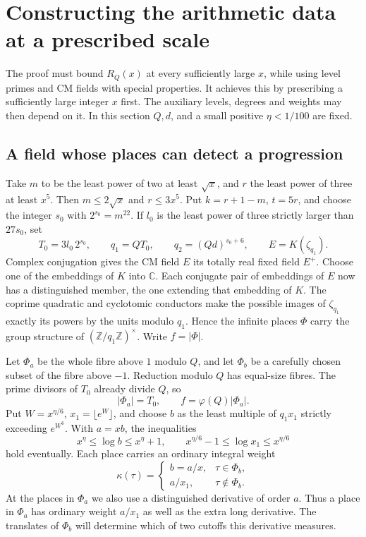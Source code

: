 \section{Constructing the arithmetic data at a prescribed scale}\label{sec:setup}
The proof must bound \(R_Q(x)\) at every sufficiently large \(x\), while using level primes and CM fields with special properties. It achieves this by prescribing a sufficiently large integer \(x\) first. The auxiliary levels, degrees and weights may then depend on it. In this section \(Q,d\), and a small positive \(\eta<1/100\) are fixed.

\subsection{A field whose places can detect a progression}
Take \(m\) to be the least power of two at least \(\sqrt{x}\), and \(r\) the least power of three at least \(x^5\). Then \(m\le2\sqrt{x}\) and \(r\le3x^5\). Put \(k=r+1-m\), \(t=5r\), and choose the integer \(s_0\) with \(2^{s_0}=m^{22}\). If \(l_0\) is the least power of three strictly larger than \(27s_0\), set
\[
 T_0=3l_0\,2^{s_0},\qquad q_1=QT_0,\qquad q_2=(Qd)^{s_0+6},
 \qquad E=K(\zeta_{q_1}).
\]
Complex conjugation gives the CM field \(E\) its totally real fixed field \(E^+\). Choose one of the embeddings of \(K\) into \(\mathbb C\). Each conjugate pair of embeddings of \(E\) now has a distinguished member, the one extending that embedding of \(K\). The coprime quadratic and cyclotomic conductors make the possible images of \(\zeta_{q_1}\) exactly its powers by the units modulo \(q_1\). Hence the infinite places \(\Phi\) carry the group structure of \((\mathbb Z/q_1\mathbb Z)^\times\). Write \(f=|\Phi|\).

Let \(\Phi_a\) be the whole fibre above \(1\) modulo \(Q\), and let \(\Phi_b\) be a carefully chosen subset of the fibre above \(-1\). Reduction modulo \(Q\) has equal-size fibres. The prime divisors of \(T_0\) already divide \(Q\), so
\[
             |\Phi_a|=T_0,\qquad f=\varphi(Q)|\Phi_a|.
\]
Put \(W=x^{\eta/6}\), \(x_1=\lfloor e^W\rfloor\), and choose \(b\) as the least multiple of \(q_1x_1\) strictly exceeding \(e^{W^6}\). With \(a=xb\), the inequalities
\[
       x^\eta\le\log b\le x^\eta+1,\qquad
       x^{\eta/6}-1\le\log x_1\le x^{\eta/6}
\]
hold eventually. Each place carries an ordinary integral weight
\[
 \kappa(\tau)=
 \begin{cases}b=a/x,&\tau\in\Phi_b,\\ a/x_1,&\tau\notin\Phi_b.\end{cases}
\]
At the places in \(\Phi_a\) we also use a distinguished derivative of order \(a\). Thus a place in \(\Phi_a\) has ordinary weight \(a/x_1\) as well as the extra long derivative. The translates of \(\Phi_b\) will determine which of two cutoffs this derivative measures.

